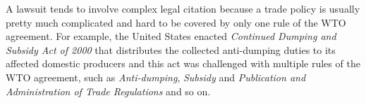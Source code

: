 A lawsuit tends to involve complex legal citation because a trade policy is usually pretty much complicated 
and hard to be covered by only one rule of the WTO agreement.
For example, the United States enacted \textit{Continued Dumping and Subsidy Act of 2000} that distributes 
the collected anti-dumping duties to its affected domestic producers and this act was challenged with multiple rules of the WTO agreement, 
such as \textit{Anti-dumping}, \textit{Subsidy} and \textit{Publication and Administration of Trade Regulations} and so on. 


